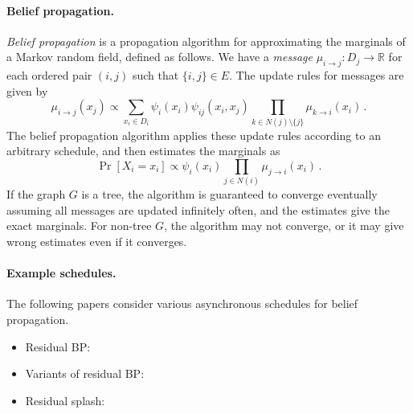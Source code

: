 \documentclass[11pt,a4paper]{article}
\theoremstyle{remark}
\newcommand{\Reals}{\mathbb{R}}
\newcommand{\range}{D}
\begin{document}
\paragraph{Belief propagation.} \emph{Belief propagation} is a propagation algorithm for approximating the marginals of a Markov random field, defined as follows. We have a \emph{message} $\mu_{i \to j} \colon \range_j \to \Reals$ for each ordered pair $(i,j)$ such that $\{ i,j \} \in E$. The update rules for messages are given by
\[ \mu_{i \to j}(x_j) \propto \sum_{x_i \in \range_i} \psi_i(x_i)\psi_{ij}(x_i,x_j) \prod_{k \in N(j)\setminus \{ j \}} \mu_{k \to i} (x_i)\,.\] 
The belief propagation algorithm applies these update rules according to an arbitrary schedule, and then estimates the marginals as
\[ \Pr[ X_i = x_i ] \propto \psi_i(x_i) \prod_{j \in N(i)} \mu_{j \to i}(x_i)\,.\]
If the graph $G$ is a tree, the algorithm is guaranteed to converge eventually assuming all messages are updated infinitely often, and the estimates give the exact marginals. For non-tree $G$, the algorithm may not converge, or it may give wrong estimates even if it converges.

\paragraph{Example schedules.} The following papers consider various asynchronous schedules for belief propagation.
\begin{itemize}[noitemsep]
    \item Residual BP: \cite{elidan2006residual}
    \item Variants of residual BP: \cite{10.1007/978-3-319-23525-7_18, Sutton:2007:IDS:3020488.3020534}
    \item Residual splash: \cite{pmlr-v5-gonzalez09a}
\end{itemize}
\end{document}
